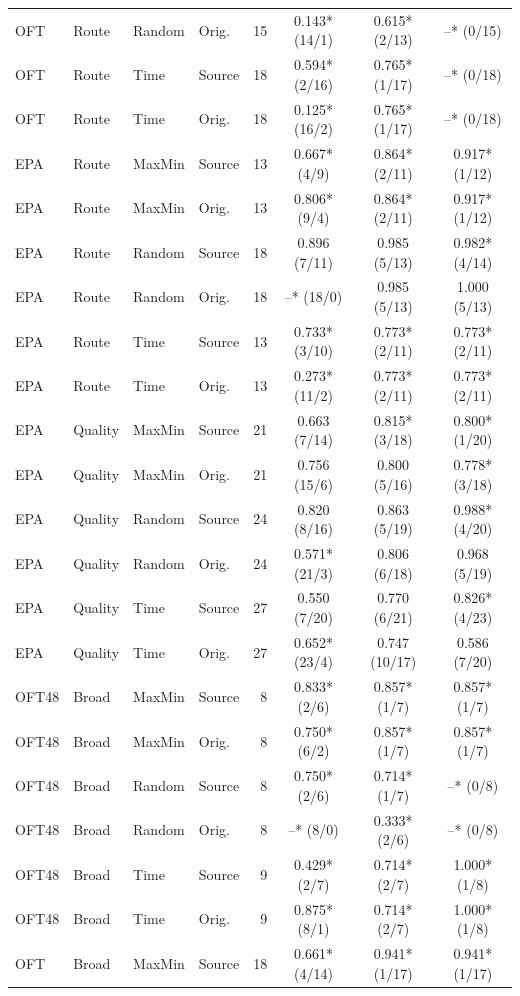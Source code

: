 \begin{longtable}{llllrccc}
OFT & Route & Random & Orig. & 15 & 0.143* (14/1) & 0.615* (2/13) & --* (0/15) \\
OFT & Route & Time & Source & 18 & 0.594* (2/16) & 0.765* (1/17) & --* (0/18) \\
OFT & Route & Time & Orig. & 18 & 0.125* (16/2) & 0.765* (1/17) & --* (0/18) \\
EPA & Route & MaxMin & Source & 13 & 0.667* (4/9) & 0.864* (2/11) & 0.917* (1/12) \\
EPA & Route & MaxMin & Orig. & 13 & 0.806* (9/4) & 0.864* (2/11) & 0.917* (1/12) \\
EPA & Route & Random & Source & 18 & 0.896 (7/11) & 0.985 (5/13) & 0.982* (4/14) \\
EPA & Route & Random & Orig. & 18 & --* (18/0) & 0.985 (5/13) & 1.000 (5/13) \\
EPA & Route & Time & Source & 13 & 0.733* (3/10) & 0.773* (2/11) & 0.773* (2/11) \\
EPA & Route & Time & Orig. & 13 & 0.273* (11/2) & 0.773* (2/11) & 0.773* (2/11) \\
EPA & Quality & MaxMin & Source & 21 & 0.663 (7/14) & 0.815* (3/18) & 0.800* (1/20) \\
EPA & Quality & MaxMin & Orig. & 21 & 0.756 (15/6) & 0.800 (5/16) & 0.778* (3/18) \\
EPA & Quality & Random & Source & 24 & 0.820 (8/16) & 0.863 (5/19) & 0.988* (4/20) \\
EPA & Quality & Random & Orig. & 24 & 0.571* (21/3) & 0.806 (6/18) & 0.968 (5/19) \\
EPA & Quality & Time & Source & 27 & 0.550 (7/20) & 0.770 (6/21) & 0.826* (4/23) \\
EPA & Quality & Time & Orig. & 27 & 0.652* (23/4) & 0.747 (10/17) & 0.586 (7/20) \\
OFT48 & Broad & MaxMin & Source & 8 & 0.833* (2/6) & 0.857* (1/7) & 0.857* (1/7) \\
OFT48 & Broad & MaxMin & Orig. & 8 & 0.750* (6/2) & 0.857* (1/7) & 0.857* (1/7) \\
OFT48 & Broad & Random & Source & 8 & 0.750* (2/6) & 0.714* (1/7) & --* (0/8) \\
OFT48 & Broad & Random & Orig. & 8 & --* (8/0) & 0.333* (2/6) & --* (0/8) \\
OFT48 & Broad & Time & Source & 9 & 0.429* (2/7) & 0.714* (2/7) & 1.000* (1/8) \\
OFT48 & Broad & Time & Orig. & 9 & 0.875* (8/1) & 0.714* (2/7) & 1.000* (1/8) \\
OFT & Broad & MaxMin & Source & 18 & 0.661* (4/14) & 0.941* (1/17) & 0.941* (1/17) \\

\end{longtable}
